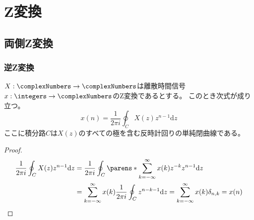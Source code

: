 \part{Z変換}
    \chapter{両側Z変換}
        \section{逆Z変換}
            \label{inv_Z_trans}
            \begin{shadebox}
                $X:\complexNumbers\to\complexNumbers$は離散時間信号$x:\integers\to\complexNumbers$のZ変換であるとする。
                このとき次式が成り立つ。
                \begin{equation}
                    \label{equation:inv_Z_trans}
                    x(n) = \frac{1}{2\pi i}\oint_C X(z)z^{n-1}\mathrm{d}z
                \end{equation}
                ここに積分路$C$は$X(z)$のすべての極を含む反時計回りの単純閉曲線である。
            \end{shadebox}
            \begin{proof}
                \begin{align*}
                    \frac{1}{2\pi i}\oint_C X(z)z^{n-1}\mathrm{d}z &= \frac{1}{2\pi i}\oint_C \parens*{\sum_{k=-\infty}^\infty x(k)z^{-k}}z^{n-1}\mathrm{d}z \\
                    &= \sum_{k=-\infty}^\infty x(k)\frac{1}{2\pi i}\oint_C z^{n-k-1}\mathrm{d}z = \sum_{k=-\infty}^\infty x(k)\delta_{n,k} = x(n)
                \end{align*}
            \end{proof}
